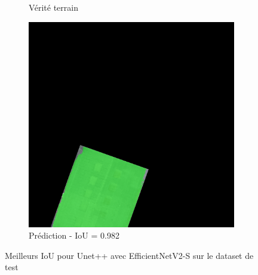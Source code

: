\begin{figure}[H]
\begin{subfigure}{0.32\textwidth}
    \caption{Vérité terrain}
\end{subfigure}
\hfill
\begin{subfigure}{0.32\textwidth}
    \includegraphics[width=\textwidth]{02-main//figures/ch4/kfold_ensembles/unetplusplus_tu-efficientnetv2_rw_s.ra2_in1k/best_cases/best_2_iou0.982_25061124_tile_11_8_51e0da_overlay_pred.png}
    \caption{Prédiction - IoU = 0.982}
\end{subfigure}

\caption{Meilleurs IoU pour Unet++ avec EfficientNetV2-S sur le dataset de test}
\label{fig:unetplusplus_efficientnetv2_s_best_cases}
\end{figure}


